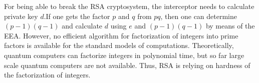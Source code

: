 \documentclass[11pt,a4paper]{amsart}
\begin{document}
For being able to break the RSA cryptosystem, the interceptor needs to calculate private key $d$.If one gets the factor $p$ and $q$ from $pq$, then one can determine $(p-1)(q-1)$ and calculate $d$ using $e$ and $(p-1)(q-1)$ by means of the EEA. However, no efficient algorithm for factorization of integers into prime factors is available for the standard models of computations. Theoretically, quantum computers can factorize integers in polynomial time, but so far large scale quantum computers are not available. Thus, RSA is relying on hardness of the factorization of integers. 
\end{document}
